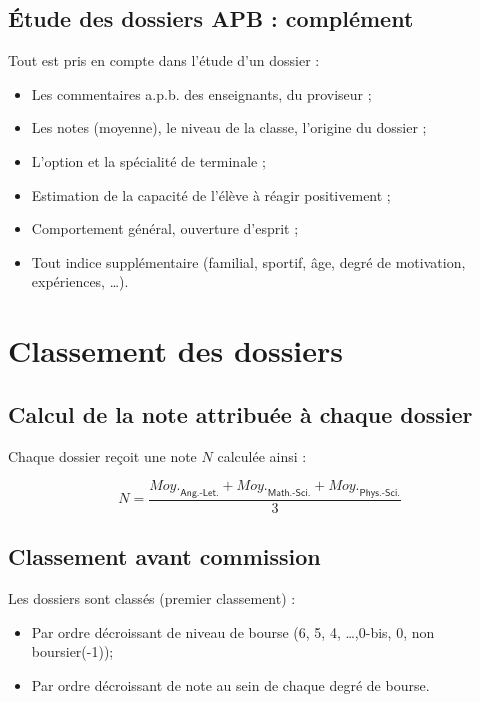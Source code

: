 \documentclass{beamer}
\begin{document}
\subsection{\'Etude des dossiers APB : complément}
\begin{frame}
Tout est pris en compte dans l'étude d'un dossier :
\begin{itemize}
\item Les commentaires a.p.b. des enseignants, du proviseur ;
\item Les notes (moyenne), le niveau de la classe, l'origine du dossier ;
\item L'option et la spécialité de terminale ;
\item Estimation de la capacité de l'élève à réagir positivement ;
\item Comportement général, ouverture d'esprit ;
\item Tout indice supplémentaire (familial, sportif, âge, degré de motivation, expériences, \ldots).
\end{itemize}
\end{frame}



\section{Classement des dossiers}
\subsection{Calcul de la note attribuée à chaque dossier}
\begin{frame}
Chaque dossier reçoit une note $N$ calculée ainsi :
\begin{large}
  \begin{equation*}
    N = \dfrac{\textit{Moy.}_{\textsf{Ang.-Let.}}+\textit{Moy.}_{\textsf{Math.-Sci.}}+\textit{Moy.}_{\textsf{Phys.-Sci.}}}{3}
  \end{equation*}
\end{large}
\end{frame}
\subsection{Classement avant commission}
\begin{frame}
Les dossiers sont classés (premier classement) :
  \begin{itemize}
  \item Par ordre décroissant de niveau de bourse (6, 5, 4, \ldots,0-bis, 0, non boursier(-1));
  \item Par ordre décroissant de note au sein de chaque degré de bourse.
  \end{itemize}
\end{frame}
\end{document}
